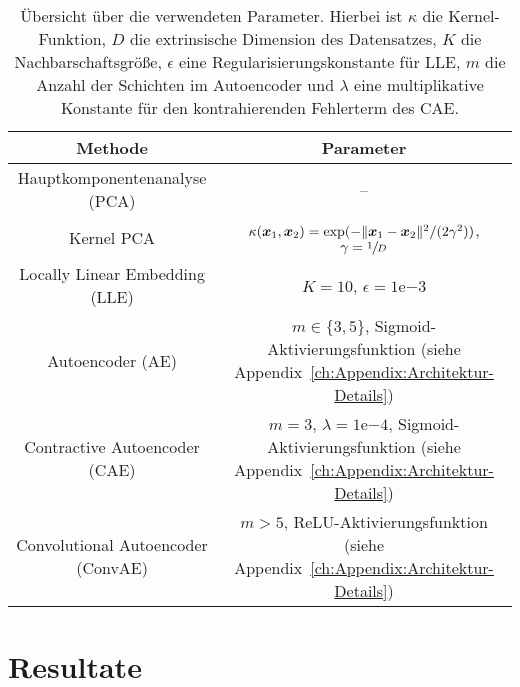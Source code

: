 \begin{table}[ht]
	\tymax=300pt
	\centering
	\begin{tabulary}{\linewidth}{CC}
		\toprule
		Methode                            & Parameter                                                            \\ \midrule
		Hauptkomponentenanalyse (PCA)      & --                                                                   \\ \midrule
		Kernel PCA                         & $\kappa(\bm{x}_1, \bm{x}_2) = \exp(- \lVert\bm{x}_1 - \bm{x}_2\rVert^2/(2\gamma^2))$, $\gamma=\sfrac{1}{D}$ \\ \midrule
		Locally Linear Embedding (LLE)     & $K=10$, $\epsilon=1\mathrm{e}{-3}$                                   \\ \midrule
		Autoencoder (AE)                   & $m \in \{3, 5\}$, Sigmoid-Aktivierungsfunktion \newline (siehe
		Appendix~\ref{ch:Appendix:Architektur-Details})                                                           \\ \midrule Contractive Autoencoder (CAE) & $m = 3$, $\lambda=1\mathrm{e}{-4}$,
		Sigmoid-Aktivierungsfunktion (siehe Appendix~\ref{ch:Appendix:Architektur-Details})                       \\ \midrule
		Convolutional Autoencoder (ConvAE) & $m > 5$, ReLU-Aktivierungsfunktion \newline (siehe
		Appendix~\ref{ch:Appendix:Architektur-Details})                                                           \\ \bottomrule
	\end{tabulary}
	\caption[Übersicht über die verwendeten Parameter der Methoden]{Übersicht über die verwendeten Parameter. Hierbei ist $\kappa$ die Kernel-Funktion, $D$ die extrinsische Dimension des Datensatzes, $K$ die Nachbarschaftsgröße, $\epsilon$ eine Regularisierungskonstante für LLE, $m$ die Anzahl der Schichten im Autoencoder und $\lambda$ eine multiplikative Konstante für den kontrahierenden Fehlerterm des CAE.}
	\label{tab:uebersicht-parameter}
\end{table}
\section{Resultate}
\label{ch:Vergleich:sec:Resultate}

